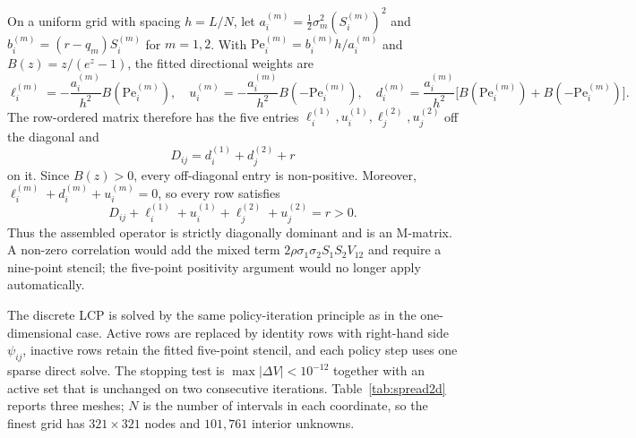 \documentclass[11pt,a4paper]{article}
\theoremstyle{definition}
\theoremstyle{remark}
\begin{document}
On a uniform grid with spacing $h=L/N$, let
$a_i^{(m)}=\tfrac12\sigma_m^2(S_i^{(m)})^2$ and
$b_i^{(m)}=(r-q_m)S_i^{(m)}$ for $m=1,2$. With
$\mathrm{Pe}_i^{(m)}=b_i^{(m)}h/a_i^{(m)}$ and
$B(z)=z/(e^z-1)$, the fitted directional weights are
\begin{equation}
    \ell_i^{(m)}=-\frac{a_i^{(m)}}{h^2}B(\mathrm{Pe}_i^{(m)}),
    \quad
    u_i^{(m)}=-\frac{a_i^{(m)}}{h^2}B(-\mathrm{Pe}_i^{(m)}),
    \quad
    d_i^{(m)}=\frac{a_i^{(m)}}{h^2}
    \bigl[B(\mathrm{Pe}_i^{(m)})+B(-\mathrm{Pe}_i^{(m)})\bigr].
    \label{eq:spread2d-weights}
\end{equation}
The row-ordered matrix therefore has the five entries
$\ell_i^{(1)},u_i^{(1)},\ell_j^{(2)},u_j^{(2)}$ off the diagonal and
\begin{equation}
    D_{ij}=d_i^{(1)}+d_j^{(2)}+r
    \label{eq:spread2d-diagonal}
\end{equation}
on it. Since $B(z)>0$, every off-diagonal entry is non-positive. Moreover,
$\ell_i^{(m)}+d_i^{(m)}+u_i^{(m)}=0$, so every row satisfies
\begin{equation}
    D_{ij}+\ell_i^{(1)}+u_i^{(1)}+\ell_j^{(2)}+u_j^{(2)}=r>0.
    \label{eq:spread2d-rowsum}
\end{equation}
Thus the assembled operator is strictly diagonally dominant and is an
M-matrix. A non-zero correlation would add the mixed term
$2\rho\sigma_1\sigma_2S_1S_2V_{12}$ and require a nine-point stencil; the
five-point positivity argument would no longer apply automatically.

The discrete LCP is solved by the same policy-iteration principle as in the
one-dimensional case. Active rows are replaced by identity rows with right-hand
side $\psi_{ij}$, inactive rows retain the fitted five-point stencil, and each
policy step uses one sparse direct solve. The stopping test is
$\max|\Delta V|<10^{-12}$ together with an active set that is unchanged on two
consecutive iterations. Table~\ref{tab:spread2d} reports three meshes; $N$ is
the number of intervals in each coordinate, so the finest grid has
$321\times321$ nodes and $101{,}761$ interior unknowns.
\end{document}
